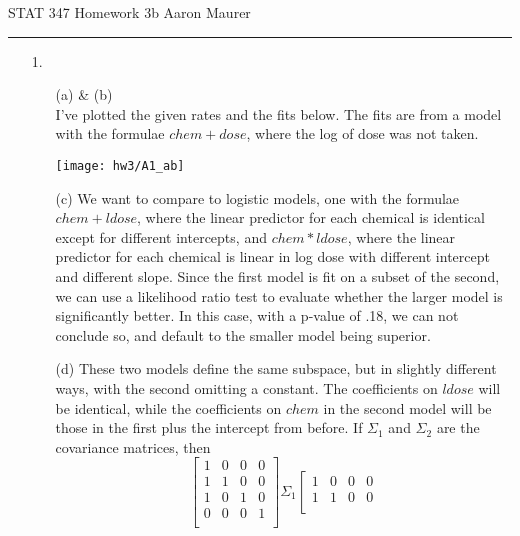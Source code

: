 \documentclass[11pt]{article}
\theoremstyle{definition}
\newcommand{\hwhead}[1]{#1 \hfill Aaron Maurer \vspace{2mm} \hrule \vspace{2mm}}
\begin{document}
\hwhead{STAT 347 Homework 3b}
\begin{itemize}
    \item[1.]
        \begin{itemize}
            \item[(a)] \& (b) \\
                I've plotted the given rates and the fits below. The fits are from a model with the formulae \(chem +dose\), where the log of dose was not taken.
                \begin{center}
                    \texttt{[image: hw3/A1\_ab]} 
                \end{center}
            \item[(c)]
                We want to compare to logistic models, one with the formulae \(chem + ldose\), where the linear predictor for each chemical is identical except for different intercepts, and \(chem*ldose\), where the linear predictor for each chemical is linear in log dose with different intercept and different slope. Since the first model is fit on a subset of the second, we can use a likelihood ratio test to evaluate whether the larger model is significantly better. In this case, with a p-value of .18, we can not conclude so, and default to the smaller model being superior.
            \item[(d)]
                These two models define the same subspace, but in slightly different ways, with the second omitting a constant. The coefficients on $ldose$ will be identical, while the coefficients on $chem$ in the second model will be those in the first plus the intercept from before. If $\Sigma_1$ and $\Sigma_2$ are the covariance matrices, then
                \[\left[\begin{array}{cccc} 1 & 0 & 0 & 0 \\
                                            1 & 1 & 0 & 0 \\
                                            1 & 0 & 1 & 0 \\
                                            0 & 0 & 0 & 1 \\
                           \end{array}\right] \Sigma_1
                   \left[\begin{array}{cccc} 1 & 0 & 0 & 0 \\
                                             1 & 1 & 0 & 0 \\

\end{array}\]
\end{itemize}
\end{itemize}
\end{document}
